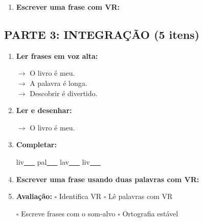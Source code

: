 \begin{exercicio}
\begin{enumerate}[resume]
  \item \textbf{Escrever uma frase com VR:}
  \begin{center}
  \underline{\hspace{12cm}}
  \end{center}

\end{enumerate}

\subsection*{PARTE 3: INTEGRAÇÃO (5 itens)}

\begin{enumerate}[resume]

  \item \textbf{Ler frases em voz alta:}
  \begin{center}
  $\rightarrow$ O livro é meu.\\
  $\rightarrow$ A palavra é longa.\\
  $\rightarrow$ Descobrir é divertido.\\
  \end{center}

  \item \textbf{Ler e desenhar:}
  \begin{center}
  $\rightarrow$ O livro é meu.
  \end{center}
  \begin{center}
  \end{center}

  \item \textbf{Completar:}
  \begin{center}
  liv\underline{~~~} \quad pal\underline{~~~} \quad lav\underline{~~~} \quad liv\underline{~~~}
  \end{center}

  \item \textbf{Escrever uma frase usando duas palavras com VR:}
  \begin{center}
  \underline{\hspace{12cm}}
  \end{center}

  \item \textbf{Avaliação:} $\square$ Identifica VR \quad $\square$ Lê palavras com VR
  \begin{center}
  $\square$ Escreve frases com o som-alvo \quad $\square$ Ortografia estável
  \end{center}


\end{enumerate}
\end{exercicio}
